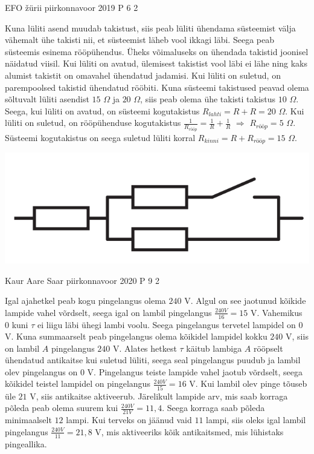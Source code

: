 \documentclass[11pt]{article}
\begin{document}
{%
{EFO žürii} %
{piirkonnavoor} %
{2019} %
{P 6} %
{2} %
{

\ifSolution
Kuna lüliti asend muudab takistust, siis peab lüliti ühendama süsteemist välja vähemalt ühe takisti nii, et süsteemist läheb vool ikkagi läbi. Seega peab süsteemis esinema rööpühendus. Üheks võimaluseks on ühendada takistid joonisel näidatud viisil. Kui lüliti on avatud, ülemisest takistist vool läbi ei lähe ning kaks alumist takistit on omavahel ühendatud jadamisi. Kui lüliti on suletud, on parempoolsed takistid ühendatud rööbiti. Kuna süsteemi takistused peavad olema sõltuvalt lüliti asendist $15$ $\Omega$ ja $20$ $\Omega$, siis peab olema ühe takisti takistus $10$ $\Omega$. Seega, kui lüliti on avatud, on süsteemi kogutakistus $R_{lahti} = R + R = 20$ $\Omega$. Kui lüliti on suletud, on rööpühenduse kogutakistus $\frac{1}{R_{rööp}} = \frac{1}{R} + \frac{1}{R}$ $\Rightarrow$ $R_{rööp} = 5$ $\Omega$. Süsteemi kogutakistus on seega suletud lüliti korral $R_{kinni} = R + R_{rööp} = 15$ $\Omega$.
\begin{center}
	\includegraphics[width=0.5\linewidth]{2019-v2p-06-lah.png}
\end{center}
\fi
}

{Kaur Aare Saar} %
{piirkonnavoor} %
{2020} %
{P 9} %
{2} %
{

\ifSolution
Igal ajahetkel peab kogu pingelangus olema $240$ V. Algul on see jaotunud kõikide lampide vahel võrdselt, seega igal on lambil pingelangus $\frac{240 V}{16} = 15$ V. Vahemikus $0$ kuni $\tau$ ei liigu läbi ühegi lambi voolu. Seega pingelangus tervetel lampidel on $0$ V. Kuna summaarselt peab pingelangus olema kõikidel lampidel kokku $240$ V, siis on lambil $A$ pingelangus $240$ V. Alates hetkest $\tau$ käitub lambiga $A$ rööpselt ühendatud antikaitse kui suletud lüliti, seega seal pingelangus puudub ja lambil olev pingelangus on $0$ V. Pingelangus teiste lampide vahel jaotub võrdselt, seega kõikidel teistel lampidel on pingelangus $\frac{240 V}{15} = 16$ V. Kui lambil olev pinge tõuseb üle $21$ V, siis antikaitse aktiveerub. Järelikult lampide arv, mis saab korraga põleda peab olema suurem kui $\frac{240 V}{21 V} = 11,4$. Seega korraga saab põleda minimaalselt $12$ lampi. Kui terveks on jäänud vaid $11$ lampi, siis oleks igal lambil pingelangus $\frac{240 V}{11}= 21,8$ V, mis aktiveeriks kõik antikaitsmed, mis lühistaks pingeallika.
\fi
}

}
\end{document}
